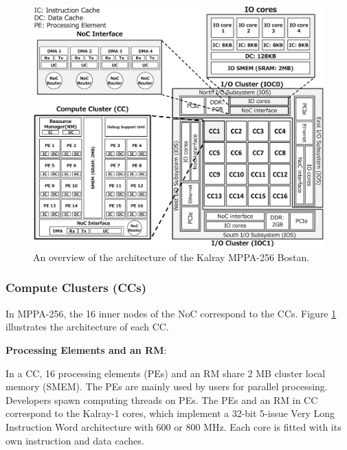 \documentclass[conference,compsoc]{IEEEtran}
\newcommand{\comment}[1]{}
\begin{document}
\begin{figure}[t]
  \centering
  \includegraphics[width=1.0\linewidth]{../figure/mppa_architecture.eps}
  \vspace{-5mm}
  \caption{\label{fig:mppa_architecture}
    An overview of the architecture of the Kalray MPPA-256 Bostan.}
\vspace{-4mm}
\end{figure}

\vspace{-2mm}
\subsubsection{Compute Clusters (CCs)}
\label{sec:cc}
In MPPA-256, the 16 inner nodes of the NoC correspond to the CCs.
Figure \ref{fig:mppa_architecture} illustrates the architecture of each CC.

\textbf{Processing Elements and an RM}:
\comment{2-3}
In a CC, 16 processing elements (PEs) and an RM share 2 MB cluster local memory (SMEM).
The PEs are mainly used by users for parallel processing.
Developers spawn computing threads on PEs.
The PEs and an RM in CC correspond to the Kalray-1 cores, which implement a 32-bit 5-issue Very Long Instruction Word architecture with 600 or 800 MHz.
Each core is fitted with its own instruction and data caches.
\end{document}
